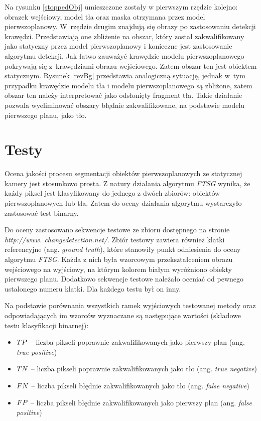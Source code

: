 \documentclass[10pt,a4paper]{article}
\begin{document}
Na rysunku \ref{stoppedObj} umieszczone zostały w pierwszym rzędzie kolejno: obrazek wejściowy, model tła oraz maska otrzymana przez model pierwszoplanowy. W~rzędzie drugim znajdują się obrazy po zastosowaniu detekcji krawędzi. Przedstawiają one zbliżenie na obszar, który został zakwalifikowany jako statyczny przez model pierwszoplanowy i konieczne jest zastosowanie algorytmu detekcji. Jak łatwo zauważyć krawędzie modelu pierwszoplanowego pokrywają się z~krawędziami obrazu wejściowego. Zatem obszar ten jest obiektem statycznym. Rysunek \ref{revBg} przedstawia analogiczną sytuację, jednak w~tym przypadku krawędzie modelu tła i modelu pierwszoplanowego są zbliżone, zatem obszar ten należy interpretować jako odsłonięty fragment tła. Takie działanie pozwala wyeliminować obszary błędnie zakwalifikowane, na podstawie modelu pierwszego planu, jako tło.

\section{Testy}

Ocena jakości procesu segmentacji obiektów pierwszoplanowych ze statycznej kamery jest stosunkowo prosta. Z natury działania algorytmu \textit{FTSG} wynika, że każdy piksel jest klasyfikowany do jednego z dwóch zbiorów: obiektów pierwszoplanowych lub tła. Zatem do oceny działania algorytmu wystarczyło zastosować test binarny. 

Do oceny zastosowano sekwencje testowe ze zbioru dostępnego na stronie \textit{http://www.
changedetection.net/}. Zbiór testowy zawiera również klatki referencyjne
(ang. \textit{ground truth}), które stanowiły punkt odniesienia do oceny algorytmu \textit{FTSG}. Każda z nich była wzorcowym przekształceniem obrazu wejściowego na wyjściowy, na którym kolorem białym wyróżniono obiekty pierwszego planu. Dodatkowo sekwencje testowe należało oceniać od pewnego ustalonego numeru klatki. Dla każdego testu był on inny.

Na podstawie porównania wszystkich ramek wyjściowych testowanej metody oraz odpowiadających im wzorców wyznaczane są następujące wartości (składowe testu klasyfikacji binarnej):
\begin{itemize}
	\item$\small TP$ -- liczba pikseli poprawnie zakwalifikowanych jako pierwszy plan (ang. \textit{true positive})
	\item $\small TN$ -- liczba pikseli poprawnie zakwalifikowanych jako tło (ang. \textit{true negative})
	\item $\small FN$ -- liczba pikseli błędnie zakwalifikowanych jako tło (ang. \textit{false negative})
	\item $\small FP$ -- liczba pikseli błędnie zakwalifikowanych jako pierwszy plan (ang. \textit{false positive})\\
\end{itemize}
\end{document}
